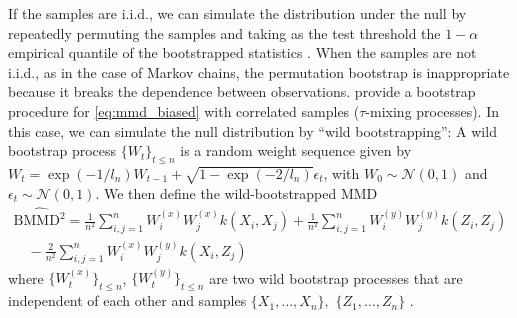 \documentclass{article}
\newcommand{\tildepi}{\tilde{\pi}}
\begin{document}
If the samples are i.i.d., we can simulate the distribution under the null by repeatedly permuting the samples and taking as the test threshold the ${1-\alpha}$ empirical quantile of the bootstrapped statistics \citep{gretton_kernel_2012}. 
When the samples are not i.i.d., as in the case of Markov chains, the permutation bootstrap is inappropriate because it breaks the dependence between observations.
\citet{chwialkowski_wild_2014} provide a bootstrap procedure for \eqref{eq:mmd_biased} with correlated samples ($\tau$-mixing processes).
In this case, we can simulate the null distribution by ``wild bootstrapping'': A wild bootstrap process $\{W_t\}_{t\leq n}$ is a random weight sequence
given by $W_{t}=\exp(-1/l_n) W_{t-1}+\sqrt{1-\exp(-2/{l_n})}\epsilon_{t}$,
with $W_{0} \sim \mathcal{N}(0,1)$ and $\epsilon_{t} \sim \mathcal{N}(0,1)$. We then define the wild-bootstrapped MMD
\begin{equation}
\begin{array}{c}
\widehat{\mathrm{BMMD}^2}=\frac{1}{n^2} \sum_{i,j=1}^{n} W_{i}^{(x)} W_{j}^{(x)} k\left(X_{i}, X_{j}\right)+\frac{1}{n^2} \sum_{i,j=1}^{n} W_{i}^{(y)} W_{j}^{(y)} k\left(Z_{i}, Z_{j}\right) \\
\quad-\frac{2}{n^2} \sum_{i,j=1}^{n}W_{i}^{(x)} W_{j}^{(y)} k\left(X_{i}, Z_{j}\right)
\end{array}
\label{eq:wb_mmd}
\end{equation}
where $\{W_{t}^{(x)}\}_{t\leq n}$, $\{W_{t}^{(y)}\}_{t\leq n}$ are two wild bootstrap processes that
are independent of each other and samples $\{X_1, \dots, X_n\},$ $\{Z_1, \dots, Z_n\}$ \cite[see][]{chwialkowski_wild_2014, leucht_dependent_2013}.


    
\end{document}
